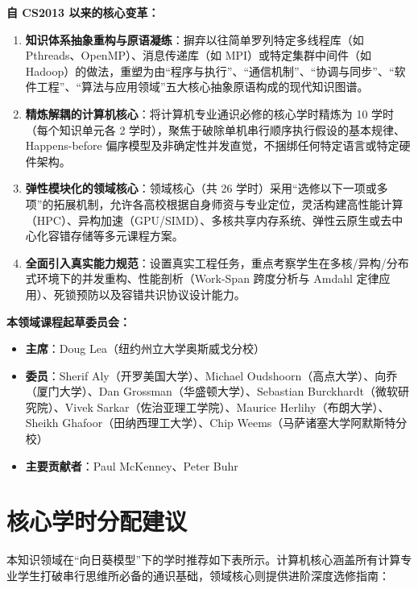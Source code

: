 \begin{preamblebox}[知识领域概述与变革]
\textbf{自 CS2013 以来的核心变革：}
\begin{enumerate}
    \item \textbf{知识体系抽象重构与原语凝练}：摒弃以往简单罗列特定多线程库（如 Pthreads、OpenMP）、消息传递库（如 MPI）或特定集群中间件（如 Hadoop）的做法，重塑为由“程序与执行”、“通信机制”、“协调与同步”、“软件工程”、“算法与应用领域”五大核心抽象原语构成的现代知识图谱。
    \item \textbf{精炼解耦的计算机核心}：将计算机专业通识必修的核心学时精炼为 10 学时（每个知识单元各 2 学时），聚焦于破除单机串行顺序执行假设的基本规律、Happens-before 偏序模型及非确定性并发直觉，不捆绑任何特定语言或特定硬件架构。
    \item \textbf{弹性模块化的领域核心}：领域核心（共 26 学时）采用“选修以下一项或多项”的拓展机制，允许各高校根据自身师资与专业定位，灵活构建高性能计算（HPC）、异构加速（GPU/SIMD）、多核共享内存系统、弹性云原生或去中心化容错存储等多元课程方案。
    \item \textbf{全面引入真实能力规范}：设置真实工程任务，重点考察学生在多核/异构/分布式环境下的并发重构、性能剖析（Work-Span 跨度分析与 Amdahl 定律应用）、死锁预防以及容错共识协议设计能力。
\end{enumerate}

\textbf{本领域课程起草委员会：}
\begin{itemize}
    \item \textbf{主席}：Doug Lea（纽约州立大学奥斯威戈分校）
    \item \textbf{委员}：Sherif Aly（开罗美国大学）、Michael Oudshoorn（高点大学）、向乔（厦门大学）、Dan Grossman（华盛顿大学）、Sebastian Burckhardt（微软研究院）、Vivek Sarkar（佐治亚理工学院）、Maurice Herlihy（布朗大学）、Sheikh Ghafoor（田纳西理工大学）、Chip Weems（马萨诸塞大学阿默斯特分校）
    \item \textbf{主要贡献者}：Paul McKenney、Peter Buhr
\end{itemize}
\end{preamblebox}

\section{核心学时分配建议}

本知识领域在“向日葵模型”下的学时推荐如下表所示。计算机核心涵盖所有计算专业学生打破串行思维所必备的通识基础，领域核心则提供进阶深度选修指南：

